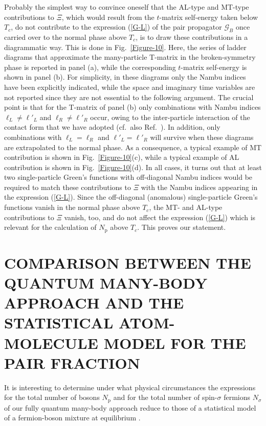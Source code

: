\documentclass[pra,twocolumn,aps,amssymb,showpacs,superscriptaddress]{revtex4-1}
\begin{document}
Probably the simplest way to convince oneself that the AL-type and MT-type contributions to $\Xi$, which would result from the $t$-matrix self-energy taken below $T_{c}$, do not contribute to the expression (\ref{G-L}) of the pair propagator $\mathcal{G}_{B}$ once carried over to the normal phase above $T_{c}$, is to draw these contributions in a diagrammatic way.
This is done in Fig.~\ref{Figure-10}.
Here, the series of ladder diagrams that approximate the many-particle T-matrix in the broken-symmetry phase is reported in panel (a), while the corresponding $t$-matrix self-energy is shown 
in panel (b). 
For simplicity,  in these diagrams only the Nambu indices have been explicitly indicated, while the space and imaginary time variables are not reported since they are not essential to the following argument.
The crucial point is that for the T-matrix of panel (b) only combinations with Nambu indices $\ell_{L} \ne \ell'_{L}$ and $\ell_{R} \ne \ell'_{R}$ occur, owing to the inter-particle interaction of the contact form that we have adopted
(cf.~also Ref.~\cite{Andrenacci-2003}).
In addition, only combinations with $\ell_{L} = \ell_{R}$ and $\ell'_{L} = \ell'_{R}$ will survive when these diagrams are extrapolated to the normal phase.
As a consequence, a typical example of MT contribution is shown in Fig.~\ref{Figure-10}(c), while a typical example of AL contribution is shown in Fig.~\ref{Figure-10}(d).
In all cases, it turns out that at least two single-particle Green's functions with off-diagonal Nambu indices would be required to match these contributions to $\Xi$ with the Nambu indices appearing in the expression 
(\ref{G-L}).
Since the off-diagonal (anomalous) single-particle Green's functions vanish in the normal phase above $T_{c}$, the MT- and AL-type contributions to $\Xi$ vanish, too, and do not affect
the expression (\ref{G-L}) which is relevant for the calculation of $N_{\mathrm{p}}$ above $T_{c}$.
This proves our statement.

\section{COMPARISON BETWEEN THE QUANTUM MANY-BODY APPROACH AND THE STATISTICAL ATOM-MOLECULE MODEL FOR THE PAIR FRACTION}
\label{sec:appendix-model}

It is interesting to determine under what physical circumstances the expressions for the total number of bosons $N_{\mathrm{p}}$ and for the total number of spin-$\sigma$ fermions $N_{\sigma}$ of our fully quantum many-body approach reduce to those of a statistical model of a fermion-boson mixture at equilibrium 
\cite{Chin-Grimm-2004,Eagles-1969}.
\end{document}
